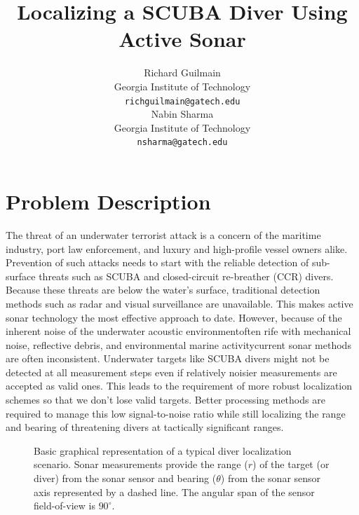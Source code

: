 \documentclass{article} %
\title{Localizing a SCUBA Diver Using Active Sonar}
\author{
Richard Guilmain \\
Georgia Institute of Technology\\
\texttt{richguilmain@gatech.edu} \\
\And
Nabin Sharma \\
Georgia Institute of Technology\\
\texttt{nsharma@gatech.edu} \\
}
\begin{document}
\maketitle


\section{Problem Description}
The threat of an underwater terrorist attack is a concern of the maritime industry, port law enforcement, and luxury and high-profile vessel owners alike. Prevention of such attacks needs to start with the reliable detection of sub-surface threats such as SCUBA and closed-circuit re-breather (CCR) divers. Because these threats are below the water's surface, traditional detection methods such as radar and visual surveillance are unavailable. This makes active sonar technology the most effective approach to date. However, because of the inherent noise of the underwater acoustic environment\textemdash often rife with mechanical noise, reflective debris, and environmental marine activity\textemdash current sonar methods are often inconsistent. Underwater targets like SCUBA divers might not be detected at all measurement steps even if relatively noisier measurements are accepted as valid ones. This leads to the requirement of more robust localization schemes so that we don't lose valid targets. Better processing methods are required to manage this low signal-to-noise ratio while still localizing the range and bearing of threatening divers at tactically significant ranges.

\begin{figure}[htbp]
  \centering
  \caption{Basic graphical representation of a typical diver localization scenario. Sonar
    measurements provide the range ($r$) of the target (or diver) from the sonar sensor and
    bearing ($\theta$) from the sonar sensor axis represented by a dashed line. The angular
    span of the sensor field-of-view is $90^{\circ}$.}
  \label{fig:sector}
\end{figure}
\end{document}
